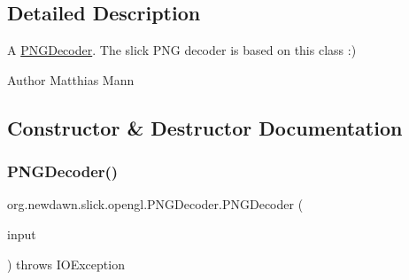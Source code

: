 \subsection{Detailed Description}
A \mbox{\hyperlink{classorg_1_1newdawn_1_1slick_1_1opengl_1_1_p_n_g_decoder}{P\+N\+G\+Decoder}}. The slick P\+NG decoder is based on this class \+:)

\begin{DoxyAuthor}{Author}
Matthias Mann 
\end{DoxyAuthor}


\subsection{Constructor \& Destructor Documentation}
\mbox{\label{classorg_1_1newdawn_1_1slick_1_1opengl_1_1_p_n_g_decoder_ae3e7f9921e7a1e1ad605cff63100d98a}} 
\subsubsection{\texorpdfstring{P\+N\+G\+Decoder()}{PNGDecoder()}}
{\footnotesize\ttfamily org.\+newdawn.\+slick.\+opengl.\+P\+N\+G\+Decoder.\+P\+N\+G\+Decoder (\begin{DoxyParamCaption}\item[{Input\+Stream}]{input }\end{DoxyParamCaption}) throws I\+O\+Exception\hspace{0.3cm}{\ttfamily [inline]}}


